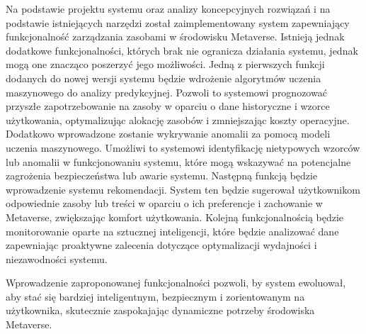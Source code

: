 Na podstawie projektu systemu oraz analizy koncepcyjnych rozwiązań i na podstawie istniejących narzędzi został zaimplementowany system zapewniający funkcjonalność zarządzania zasobami w środowisku Metaverse. Istnieją jednak dodatkowe funkcjonalności, których brak nie ogranicza działania systemu, jednak mogą one znacząco poszerzyć jego możliwości. Jedną z pierwszych funkcji dodanych do nowej wersji systemu będzie wdrożenie algorytmów uczenia maszynowego do analizy predykcyjnej. Pozwoli to systemowi prognozować przyszłe zapotrzebowanie na zasoby w oparciu o dane historyczne i wzorce użytkowania, optymalizując alokację zasobów i zmniejszając koszty operacyjne. Dodatkowo wprowadzone zostanie wykrywanie anomalii za pomocą modeli uczenia maszynowego. Umożliwi to systemowi identyfikację nietypowych wzorców lub anomalii w funkcjonowaniu systemu, które mogą wskazywać na potencjalne zagrożenia bezpieczeństwa lub awarie systemu. Następną funkcją będzie wprowadzenie systemu rekomendacji. System ten będzie sugerował użytkownikom odpowiednie zasoby lub treści w oparciu o ich preferencje i zachowanie w Metaverse, zwiększając komfort użytkowania. Kolejną funkcjonalnością będzie monitorowanie oparte na sztucznej inteligencji, które będzie analizować dane zapewniając proaktywne zalecenia dotyczące optymalizacji wydajności i niezawodności systemu.

Wprowadzenie zaproponowanej funkcjonalności pozwoli, by system ewoluował, aby stać się bardziej inteligentnym, bezpiecznym i zorientowanym na użytkownika, skutecznie zaspokajając dynamiczne potrzeby środowiska Metaverse.